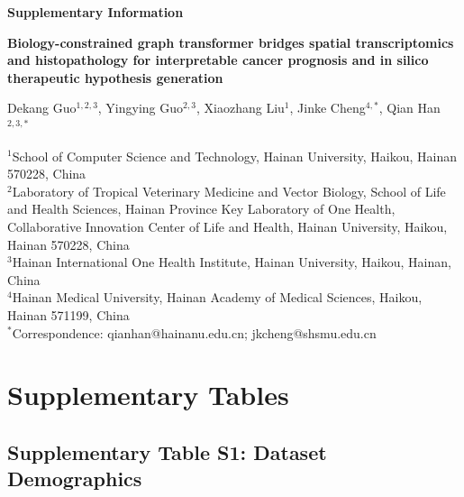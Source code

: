 \documentclass[11pt,a4paper]{article}
\begin{document}

\begin{center}
{\Large\bfseries Supplementary Information}
\vspace{1cm}

{\large\bfseries Biology-constrained graph transformer bridges spatial transcriptomics and histopathology for interpretable cancer prognosis and in silico therapeutic hypothesis generation}
\vspace{0.8cm}

Dekang Guo$^{1,2,3}$, Yingying Guo$^{2,3}$, Xiaozhang Liu$^{1}$, Jinke Cheng$^{4,*}$, Qian Han$^{2,3,*}$
\vspace{0.5cm}

{\small
$^{1}$School of Computer Science and Technology, Hainan University, Haikou, Hainan 570228, China\\[0.3em]
$^{2}$Laboratory of Tropical Veterinary Medicine and Vector Biology, School of Life and Health Sciences, Hainan Province Key Laboratory of One Health, Collaborative Innovation Center of Life and Health, Hainan University, Haikou, Hainan 570228, China\\[0.3em]
$^{3}$Hainan International One Health Institute, Hainan University, Haikou, Hainan, China\\[0.3em]
$^{4}$Hainan Medical University, Hainan Academy of Medical Sciences, Haikou, Hainan 571199, China\\[0.5em]
$^{*}$Correspondence: qianhan@hainanu.edu.cn; jkcheng@shsmu.edu.cn
}
\end{center}

\vspace{1.5cm}

\tableofcontents

\newpage


\section{Supplementary Tables}

\subsection{Supplementary Table S1: Dataset Demographics}
\end{document}
